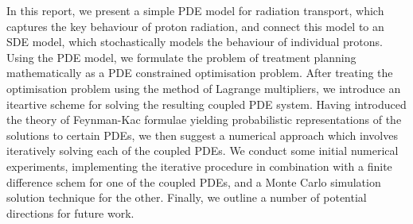 In this report, we present a simple PDE model for radiation transport, which captures the key behaviour of proton radiation, and connect this model to an SDE model, which stochastically models the behaviour of individual protons. Using the PDE model, we formulate the problem of treatment planning mathematically as a PDE constrained optimisation problem. After treating the optimisation problem using the method of Lagrange multipliers, we introduce an iteartive scheme for solving the resulting coupled PDE system. Having introduced the theory of Feynman-Kac formulae yielding probabilistic representations of the solutions to certain PDEs, we then suggest a numerical approach which involves iteratively solving each of the coupled PDEs. We conduct some initial numerical experiments, implementing the iterative procedure in combination with a finite difference schem for one of the coupled PDEs, and a Monte Carlo simulation solution technique for the other. Finally, we outline a number of potential directions for future work.